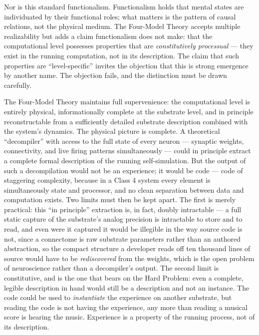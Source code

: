 \documentclass[12pt]{article}
\begin{document}
Nor is this standard functionalism. Functionalism holds that mental states are individuated by their functional roles; what matters is the pattern of causal relations, not the physical medium. The Four-Model Theory accepts multiple realizability but adds a claim functionalism does not make: that the computational level possesses properties that are \emph{constitutively processual} --- they exist in the running computation, not in its description. The claim that such properties are ``level-specific'' invites the objection that this is strong emergence by another name. The objection fails, and the distinction must be drawn carefully.

The Four-Model Theory maintains full supervenience: the computational level is entirely physical, informationally complete at the substrate level, and in principle reconstructable from a sufficiently detailed substrate description combined with the system's dynamics. The physical picture is complete. A theoretical ``decompiler'' with access to the full state of every neuron --- synaptic weights, connectivity, and live firing patterns simultaneously --- could in principle extract a complete formal description of the running self-simulation. But the output of such a decompilation would not be an experience; it would be code --- code of staggering complexity, because in a Class 4 system every element is simultaneously state and processor, and no clean separation between data and computation exists. Two limits must then be kept apart. The first is merely practical: this ``in principle'' extraction is, in fact, doubly intractable --- a full static capture of the substrate's analog precision is intractable to store and to read, and even were it captured it would be illegible in the way source code is not, since a connectome is raw substrate parameters rather than an authored abstraction, so the compact structure a developer reads off ten thousand lines of source would have to be \emph{rediscovered} from the weights, which is the open problem of neuroscience rather than a decompiler's output. The second limit is constitutive, and is the one that bears on the Hard Problem: even a complete, legible description in hand would still be a description and not an instance. The code could be used to \emph{instantiate} the experience on another substrate, but reading the code is not having the experience, any more than reading a musical score is hearing the music. Experience is a property of the running process, not of its description.
\end{document}
